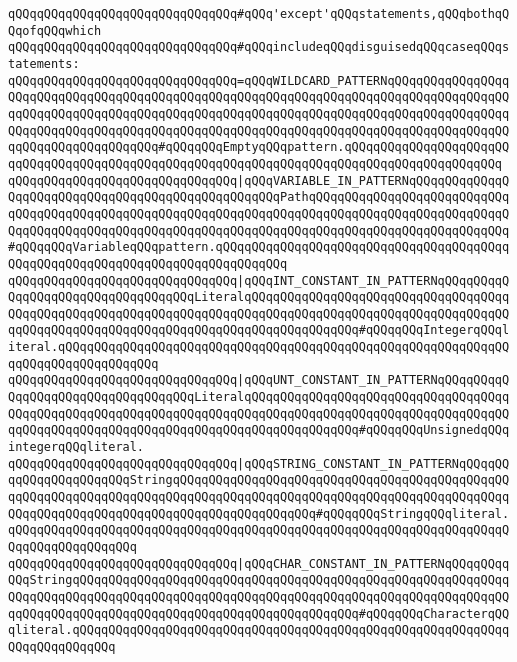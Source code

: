 \verb|qQQqqQQqqQQqqQQqqQQqqQQqqQQqqQQq#qQQq'except'qQQqstatements,qQQqbothqQQqofqQQqwhich|\newline
\verb|qQQqqQQqqQQqqQQqqQQqqQQqqQQqqQQq#qQQqincludeqQQqdisguisedqQQqcaseqQQqstatements:|\newline
\newline
\newline
\verb|qQQqqQQqqQQqqQQqqQQqqQQqqQQqqQQq=qQQqWILDCARD_PATTERNqQQqqQQqqQQqqQQqqQQqqQQqqQQqqQQqqQQqqQQqqQQqqQQqqQQqqQQqqQQqqQQqqQQqqQQqqQQqqQQqqQQqqQQqqQQqqQQqqQQqqQQqqQQqqQQqqQQqqQQqqQQqqQQqqQQqqQQqqQQqqQQqqQQqqQQqqQQqqQQqqQQqqQQqqQQqqQQqqQQqqQQqqQQqqQQqqQQqqQQqqQQqqQQqqQQqqQQqqQQqqQQqqQQqqQQqqQQqqQQqqQQqqQQq#qQQqqQQqEmptyqQQqpattern.qQQqqQQqqQQqqQQqqQQqqQQqqQQqqQQqqQQqqQQqqQQqqQQqqQQqqQQqqQQqqQQqqQQqqQQqqQQqqQQqqQQqqQQqqQQq|\newline
\verb|qQQqqQQqqQQqqQQqqQQqqQQqqQQqqQQq|\verb#|qQQqVARIABLE_IN_PATTERNqQQqqQQqqQQqqQQqqQQqqQQqqQQqqQQqqQQqqQQqqQQqqQQqqQQqPathqQQqqQQqqQQqqQQqqQQqqQQqqQQqqQQqqQQqqQQqqQQqqQQqqQQqqQQqqQQqqQQqqQQqqQQqqQQqqQQqqQQqqQQqqQQqqQQqqQQqqQQqqQQqqQQqqQQqqQQqqQQqqQQqqQQqqQQqqQQqqQQqqQQqqQQqqQQqqQQqqQQqqQQq#\verb|#qQQqqQQqVariableqQQqpattern.qQQqqQQqqQQqqQQqqQQqqQQqqQQqqQQqqQQqqQQqqQQqqQQqqQQqqQQqqQQqqQQqqQQqqQQqqQQqqQQq|\newline
\verb|qQQqqQQqqQQqqQQqqQQqqQQqqQQqqQQq|\verb#|qQQqINT_CONSTANT_IN_PATTERNqQQqqQQqqQQqqQQqqQQqqQQqqQQqqQQqqQQqLiteralqQQqqQQqqQQqqQQqqQQqqQQqqQQqqQQqqQQqqQQqqQQqqQQqqQQqqQQqqQQqqQQqqQQqqQQqqQQqqQQqqQQqqQQqqQQqqQQqqQQqqQQqqQQqqQQqqQQqqQQqqQQqqQQqqQQqqQQqqQQqqQQqqQQqqQQqqQQq#\verb|#qQQqqQQqIntegerqQQqliteral.qQQqqQQqqQQqqQQqqQQqqQQqqQQqqQQqqQQqqQQqqQQqqQQqqQQqqQQqqQQqqQQqqQQqqQQqqQQqqQQqqQQq|\newline
\verb|qQQqqQQqqQQqqQQqqQQqqQQqqQQqqQQq|\verb#|qQQqUNT_CONSTANT_IN_PATTERNqQQqqQQqqQQqqQQqqQQqqQQqqQQqqQQqqQQqLiteralqQQqqQQqqQQqqQQqqQQqqQQqqQQqqQQqqQQqqQQqqQQqqQQqqQQqqQQqqQQqqQQqqQQqqQQqqQQqqQQqqQQqqQQqqQQqqQQqqQQqqQQqqQQqqQQqqQQqqQQqqQQqqQQqqQQqqQQqqQQqqQQqqQQqqQQqqQQq#\verb|#qQQqqQQqUnsignedqQQqintegerqQQqliteral.|\newline
\verb|qQQqqQQqqQQqqQQqqQQqqQQqqQQqqQQq|\verb#|qQQqSTRING_CONSTANT_IN_PATTERNqQQqqQQqqQQqqQQqqQQqqQQqStringqQQqqQQqqQQqqQQqqQQqqQQqqQQqqQQqqQQqqQQqqQQqqQQqqQQqqQQqqQQqqQQqqQQqqQQqqQQqqQQqqQQqqQQqqQQqqQQqqQQqqQQqqQQqqQQqqQQqqQQqqQQqqQQqqQQqqQQqqQQqqQQqqQQqqQQqqQQqqQQq#\verb|#qQQqqQQqStringqQQqliteral.qQQqqQQqqQQqqQQqqQQqqQQqqQQqqQQqqQQqqQQqqQQqqQQqqQQqqQQqqQQqqQQqqQQqqQQqqQQqqQQqqQQqqQQq|\newline
\verb|qQQqqQQqqQQqqQQqqQQqqQQqqQQqqQQq|\verb#|qQQqCHAR_CONSTANT_IN_PATTERNqQQqqQQqqQQqStringqQQqqQQqqQQqqQQqqQQqqQQqqQQqqQQqqQQqqQQqqQQqqQQqqQQqqQQqqQQqqQQqqQQqqQQqqQQqqQQqqQQqqQQqqQQqqQQqqQQqqQQqqQQqqQQqqQQqqQQqqQQqqQQqqQQqqQQqqQQqqQQqqQQqqQQqqQQqqQQqqQQqqQQqqQQqqQQqqQQq#\verb|#qQQqqQQqCharacterqQQqliteral.qQQqqQQqqQQqqQQqqQQqqQQqqQQqqQQqqQQqqQQqqQQqqQQqqQQqqQQqqQQqqQQqqQQqqQQqqQQq|\newline
